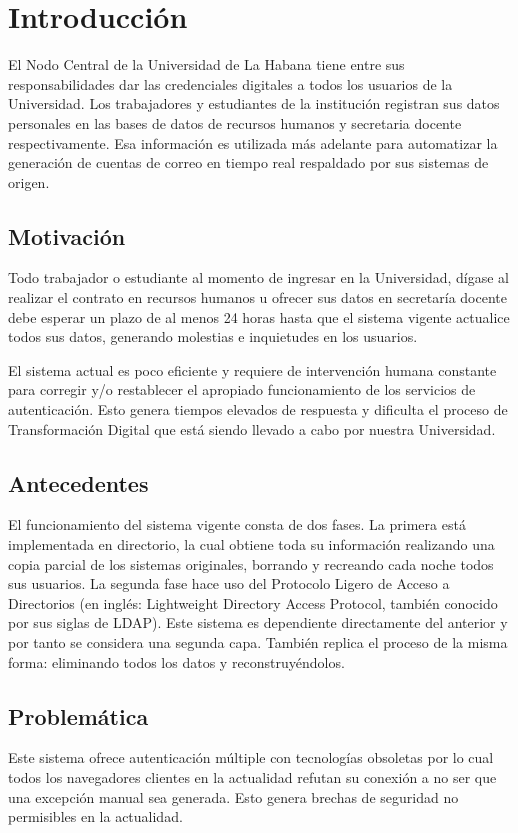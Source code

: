 \chapter*{Introducción}\label{chapter:introduction}
El Nodo Central de la Universidad de La Habana tiene entre sus responsabilidades dar  las credenciales  digitales a todos los usuarios de la Universidad. Los trabajadores y estudiantes de la instituci\'on registran sus datos personales en las bases de datos de recursos humanos y secretaria docente respectivamente. Esa informaci\'on  es utilizada m\'as adelante para automatizar la generación de cuentas de correo en tiempo real respaldado por sus sistemas de origen.


\section*{Motivación}
Todo trabajador o estudiante al momento de ingresar en la Universidad, dígase al realizar el contrato en recursos humanos u ofrecer sus datos en secretaría docente debe esperar un plazo de al menos 24 horas hasta que el sistema vigente actualice todos sus datos, generando molestias e inquietudes en los usuarios.

El sistema actual es poco eficiente y requiere de intervención humana constante para corregir y/o restablecer el apropiado funcionamiento de los servicios de autenticación. Esto genera tiempos elevados de respuesta y dificulta el proceso de Transformación Digital que está siendo llevado a cabo por nuestra Universidad.

\section*{Antecedentes}
El funcionamiento del sistema vigente consta de dos fases. La primera está implementada en directorio, la cual obtiene toda su información realizando una copia parcial de los sistemas originales, borrando y recreando cada noche todos sus usuarios. La segunda fase hace uso del Protocolo Ligero de Acceso a Directorios (en inglés: Lightweight Directory Access Protocol, también conocido por sus siglas de LDAP). Este sistema es dependiente directamente del anterior y por tanto se considera una segunda capa. También replica el proceso de la misma forma: eliminando todos los datos y reconstruyéndolos. 
\section*{Problemática}
 Este sistema ofrece autenticación múltiple con tecnologías obsoletas por lo cual todos los navegadores clientes en la actualidad refutan su conexión a no ser que una excepción manual sea generada. Esto genera brechas de seguridad no permisibles en la actualidad.

